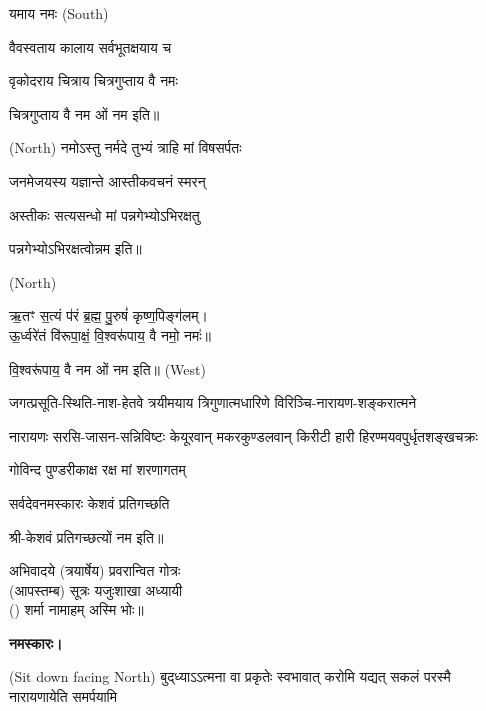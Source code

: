 यमाय नमः   {\scriptsize (South)}

{वैवस्वताय   कालाय   सर्वभूतक्षयाय   च}

{वृकोदराय   चित्राय   चित्रगुप्ताय   वै  नमः}

चित्रगुप्ताय   वै  नम ओं नम इति॥

 {\scriptsize (North)}
{नमोऽस्तु नर्मदे तुभ्यं त्राहि मां विषसर्पतः}

{जनमेजयस्य यज्ञान्ते आस्तीकवचनं स्मरन्}


{अस्तीकः सत्यसन्धो मां पन्नगेभ्योऽभिरक्षतु}

पन्नगेभ्योऽभिरक्षत्वोन्नम इति॥

 {\scriptsize (North)}

ऋ॒तꣳ स॒त्यं प॑रं ब्र॒ह्म॒ पु॒रुषं॑ कृष्ण॒पिङ्ग॑लम्।\\
ऊ॒र्ध्वरे॑तं वि॑रूपा॒क्षं॒ वि॒श्वरू॑पाय॒ वै नमो॒ नमः॑॥


वि॒श्वरू॑पाय॒ वै नम ओं नम इति॥
{\scriptsize (West)}

{जगत्प्रसूति-स्थिति-नाश-हेतवे}
{त्रयीमयाय त्रिगुणात्मधारिणे}
{विरिञ्चि-नारायण-शङ्करात्मने}

{नारायणः सरसि-जासन-सन्निविष्टः}
{केयूरवान् मकरकुण्डलवान् किरीटी}
{हारी हिरण्मयवपुर्धृतशङ्खचक्रः}

{गोविन्द पुण्डरीकाक्ष रक्ष मां शरणागतम्}

{सर्वदेवनमस्कारः केशवं प्रतिगच्छति}

श्री-केशवं प्रतिगच्छत्यों नम इति॥

अभिवादये \blank{} (त्रयार्षेय) प्रवरान्वित \blank{} गोत्रः\\
(आपस्तम्ब) सूत्रः यजुःशाखा अध्यायी\\
() शर्मा नामाहम् अस्मि भोः॥

\textbf{नमस्कारः।}


{\scriptsize (Sit down facing North)}
{बुद्‌ध्याऽऽत्मना वा प्रकृतेः स्वभावात्}
{करोमि यद्यत् सकलं परस्मै}
{नारायणायेति समर्पयामि}

